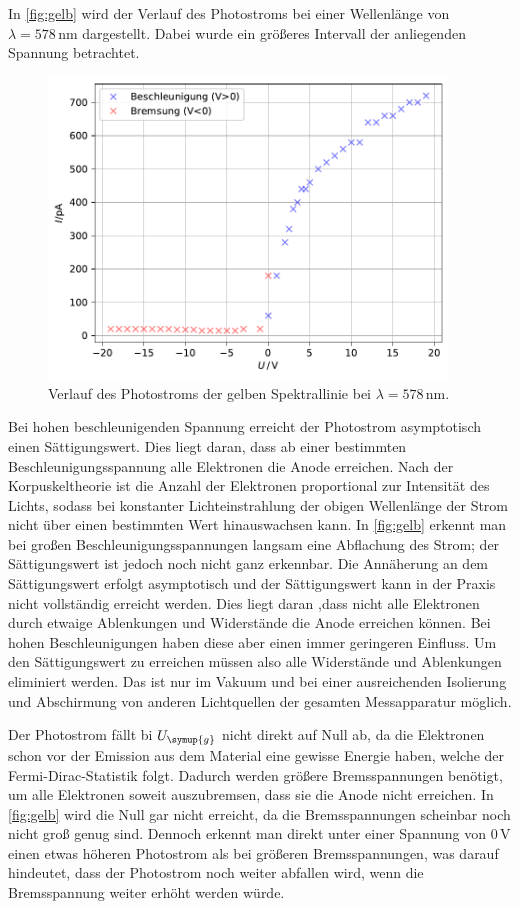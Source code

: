 
In \autoref{fig:gelb} wird der Verlauf des Photostroms bei einer Wellenlänge von $\lambda = 578 \,\unit{\nm}$ dargestellt. Dabei wurde ein größeres 
Intervall der anliegenden Spannung betrachtet. 
\begin{figure}
    \centering
    \includegraphics[height = 8cm]{build/plotgelb.pdf}
    \caption{Verlauf des Photostroms der gelben Spektrallinie bei $\lambda = 578 \,\unit{\nm}$.}
    \label{fig:gelb}
\end{figure}
Bei hohen beschleunigenden Spannung erreicht der Photostrom asymptotisch einen Sättigungswert. Dies liegt daran, dass ab einer bestimmten
Beschleunigungsspannung alle Elektronen die Anode erreichen. Nach der Korpuskeltheorie ist die Anzahl der Elektronen proportional zur Intensität 
des Lichts, sodass bei konstanter Lichteinstrahlung der obigen Wellenlänge der Strom nicht über einen bestimmten Wert hinauswachsen kann. In 
\autoref{fig:gelb} erkennt man bei großen Beschleunigungsspannungen langsam eine Abflachung des Strom; der Sättigungswert ist jedoch noch nicht ganz erkennbar.
Die Annäherung an dem Sättigungswert erfolgt asymptotisch und der Sättigungswert kann in der Praxis nicht vollständig erreicht werden. Dies liegt daran ,dass 
nicht alle Elektronen durch etwaige Ablenkungen und Widerstände die Anode erreichen können. Bei hohen Beschleunigungen haben diese aber einen immer geringeren 
Einfluss. Um den Sättigungswert zu erreichen müssen also alle Widerstände und Ablenkungen eliminiert werden. Das ist nur im Vakuum und bei einer ausreichenden 
Isolierung und Abschirmung von anderen Lichtquellen der  gesamten Messapparatur möglich.

Der Photostrom fällt bi $U_{\symup{g}}$ nicht direkt auf Null ab, da die Elektronen schon vor der Emission aus dem Material eine gewisse Energie 
haben, welche der Fermi-Dirac-Statistik folgt. Dadurch werden größere Bremsspannungen benötigt, um alle Elektronen soweit auszubremsen, dass sie die 
Anode nicht erreichen. In \autoref{fig:gelb} wird die Null gar nicht erreicht, da die Bremsspannungen scheinbar noch nicht groß genug sind. Dennoch erkennt 
man direkt unter einer Spannung von $0\,\unit{\volt}$ einen etwas höheren Photostrom als bei größeren Bremsspannungen, was darauf hindeutet, dass 
der Photostrom noch weiter abfallen wird, wenn die Bremsspannung weiter erhöht werden würde.


